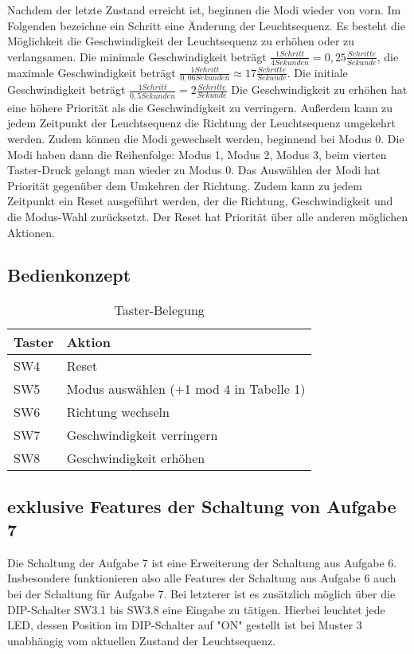 \documentclass[parskip=full]{scrartcl}
\begin{document}
			Nachdem der letzte Zustand erreicht ist, beginnen die Modi wieder von vorn.
			Im Folgenden bezeichne ein Schritt eine Änderung der Leuchtsequenz.
			 Es besteht die Möglichkeit die Geschwindigkeit der Leuchtsequenz zu erhöhen oder zu verlangsamen. Die minimale Geschwindigkeit beträgt $\frac{1 Schritt}{4 Sekunden} = 0,25 \frac{Schritte}{Sekunde}$, die maximale Geschwindigkeit beträgt $\frac{1 Schritt}{0,06 Sekunden} \approx 17 \frac{Schritte}{Sekunde}$. Die initiale Geschwindigkeit beträgt $\frac{1 Schritt}{0,5 Sekunden} = 2 \frac{Schritte}{Sekunde}$ Die Geschwindigkeit zu erhöhen hat eine höhere Priorität als die Geschwindigkeit zu verringern.
			Außerdem kann zu jedem Zeitpunkt der Leuchtsequenz die Richtung der Leuchtsequenz umgekehrt werden.
			Zudem können die Modi gewechselt werden, beginnend bei Modus 0. Die Modi haben dann die Reihenfolge: Modus 1, Modus 2, Modus 3, beim vierten Taster-Druck gelangt man wieder zu Modus 0.
			Das Auswählen der Modi hat Priorität gegenüber dem Umkehren der Richtung.
			Zudem kann zu jedem Zeitpunkt ein Reset ausgeführt werden, der die Richtung, Geschwindigkeit und die Modus-Wahl zurücksetzt.
			Der Reset hat Priorität über alle anderen möglichen Aktionen.
			
			\subsection{Bedienkonzept}
				\begin{table}[H]
					\centering
					\caption{Taster-Belegung}
					\label{my-label}
					\begin{tabular}{l|l}
						Taster & Aktion                                  \\
						\hline
						SW4    & Reset                                   \\
						SW5    & Modus auswählen (+1 mod 4 in Tabelle 1) \\
						SW6    & Richtung wechseln                       \\
						SW7    & Geschwindigkeit verringern              \\
						SW8    & Geschwindigkeit erhöhen                
					\end{tabular}
				\end{table}
			
			\subsection{exklusive Features der Schaltung von Aufgabe 7}
				Die Schaltung der Aufgabe 7 ist eine Erweiterung der Schaltung aus Aufgabe 6. Insbesondere funktionieren also alle Features der Schaltung aus Aufgabe 6 auch bei der Schaltung für Aufgabe 7.
				Bei letzterer ist es zusätzlich möglich über die DIP-Schalter SW3.1 bis SW3.8 eine Eingabe zu tätigen. Hierbei leuchtet jede LED, dessen Position im DIP-Schalter auf "ON" gestellt ist bei Muster 3 unabhängig vom aktuellen Zustand der Leuchtsequenz.
	
\end{document}
